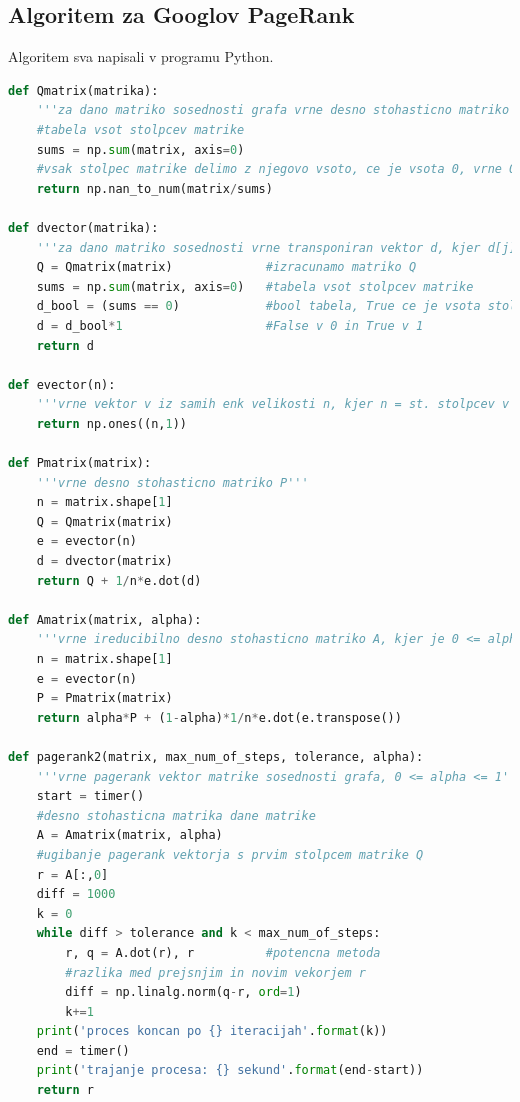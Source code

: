 \documentclass[12pt,a4paper]{amsart}
\begin{document}
\subsection{Algoritem za Googlov PageRank} Algoritem sva napisali v programu Python.
\begin{lstlisting}[language=Python]
def Qmatrix(matrika):
    '''za dano matriko sosednosti grafa vrne desno stohasticno matriko Q, kjer so nekateri stolpci se vedno nicelni'''
    #tabela vsot stolpcev matrike
    sums = np.sum(matrix, axis=0) 
    #vsak stolpec matrike delimo z njegovo vsoto, ce je vsota 0, vrne 0 namesto nan      
    return np.nan_to_num(matrix/sums)   

def dvector(matrika):
    '''za dano matriko sosednosti vrne transponiran vektor d, kjer d[j] = 1 ; ce #(outlinkov od j) = 0 in d[j] = 0 ; sicer'''
    Q = Qmatrix(matrix)             #izracunamo matriko Q
    sums = np.sum(matrix, axis=0)   #tabela vsot stolpcev matrike
    d_bool = (sums == 0)            #bool tabela, True ce je vsota stolpca enaka 0 in False sicer
    d = d_bool*1                    #False v 0 in True v 1
    return d

def evector(n):
    '''vrne vektor v iz samih enk velikosti n, kjer n = st. stolpcev v matriki'''
    return np.ones((n,1))    

def Pmatrix(matrix):
    '''vrne desno stohasticno matriko P'''
    n = matrix.shape[1]
    Q = Qmatrix(matrix)
    e = evector(n)
    d = dvector(matrix)
    return Q + 1/n*e.dot(d)

def Amatrix(matrix, alpha):
    '''vrne ireducibilno desno stohasticno matriko A, kjer je 0 <= alpha <= 1'''
    n = matrix.shape[1]
    e = evector(n)
    P = Pmatrix(matrix)
    return alpha*P + (1-alpha)*1/n*e.dot(e.transpose())

def pagerank2(matrix, max_num_of_steps, tolerance, alpha):
    '''vrne pagerank vektor matrike sosednosti grafa, 0 <= alpha <= 1'''
    start = timer()
    #desno stohasticna matrika dane matrike
    A = Amatrix(matrix, alpha)
    #ugibanje pagerank vektorja s prvim stolpcem matrike Q   
    r = A[:,0]  
    diff = 1000
    k = 0
    while diff > tolerance and k < max_num_of_steps:
        r, q = A.dot(r), r          #potencna metoda
        #razlika med prejsnjim in novim vekorjem r
        diff = np.linalg.norm(q-r, ord=1)   
        k+=1
    print('proces koncan po {} iteracijah'.format(k))
    end = timer()
    print('trajanje procesa: {} sekund'.format(end-start))  
    return r


\end{lstlisting}
\end{document}
